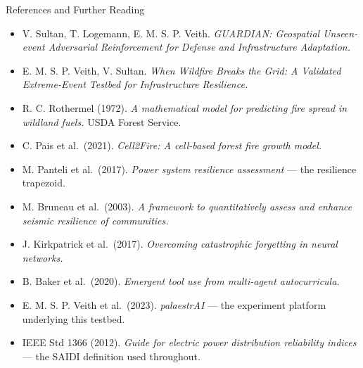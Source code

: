\documentclass[aspectratio=169,9pt]{beamer}
\begin{document}
\begin{frame}{References and Further Reading}{}
  \footnotesize
  \begin{itemize}
    \item V. Sultan, T. Logemann, E. M. S. P. Veith. \emph{GUARDIAN:
          Geospatial Unseen-event Adversarial Reinforcement for Defense and
          Infrastructure Adaptation.}
    \item E. M. S. P. Veith, V. Sultan. \emph{When Wildfire Breaks the Grid:
          A Validated Extreme-Event Testbed for Infrastructure Resilience.}
    \item R. C. Rothermel (1972). \emph{A mathematical model for predicting
          fire spread in wildland fuels.} USDA Forest Service.
    \item C. Pais et al.\ (2021). \emph{Cell2Fire: A cell-based forest fire
          growth model.}
    \item M. Panteli et al.\ (2017). \emph{Power system resilience
          assessment} --- the resilience trapezoid.
    \item M. Bruneau et al.\ (2003). \emph{A framework to quantitatively
          assess and enhance seismic resilience of communities.}
    \item J. Kirkpatrick et al.\ (2017). \emph{Overcoming catastrophic
          forgetting in neural networks.}
    \item B. Baker et al.\ (2020). \emph{Emergent tool use from multi-agent
          autocurricula.}
    \item E. M. S. P. Veith et al.\ (2023). \emph{palaestrAI} --- the
          experiment platform underlying this testbed.
    \item IEEE Std 1366 (2012). \emph{Guide for electric power distribution
          reliability indices} --- the SAIDI definition used throughout.
  \end{itemize}
\end{frame}

\begin{frame}
\end{frame}
\end{document}
